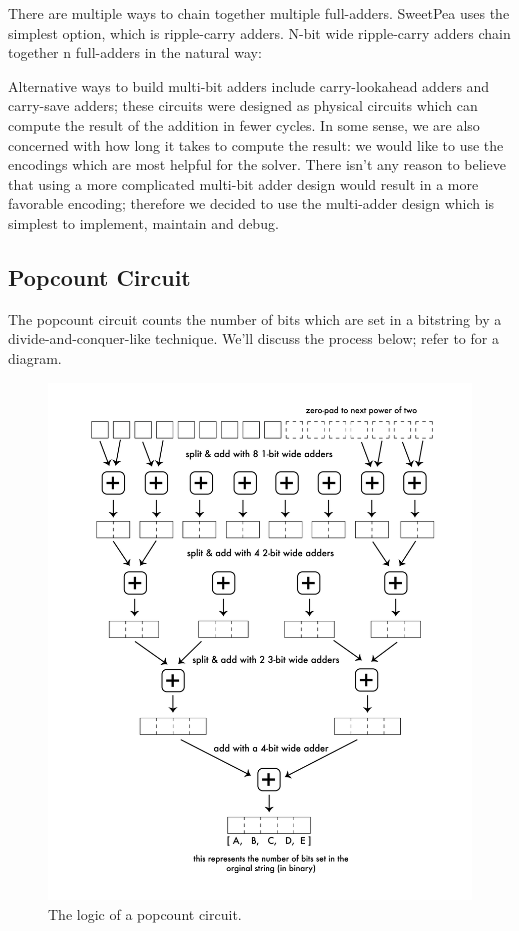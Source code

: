 There are multiple ways to chain together multiple full-adders. SweetPea uses the simplest option, which is ripple-carry adders. N-bit wide ripple-carry adders chain together n full-adders in the natural way:

Alternative ways to build multi-bit adders include carry-lookahead adders and carry-save adders; these circuits were designed as physical circuits which can compute the result of the addition in fewer cycles. In some sense, we are also concerned with how long it takes to compute the result: we would like to use the encodings which are most helpful for the solver. There isn't any reason to believe that using a more complicated multi-bit adder design would result in a more favorable encoding; therefore we decided to use the multi-adder design which is simplest to implement, maintain and debug.

\subsection{Popcount Circuit}

The popcount circuit counts the number of bits which are set in a bitstring by a divide-and-conquer-like technique. We'll discuss the process below; refer to  for a diagram.

\begin{figure}[t]
    \centerline{\includegraphics[origin=c,width=12cm]{fig_popcount}}
    \caption{The logic of a popcount circuit.}%
    \label{fig:popcount}%
\end{figure}

